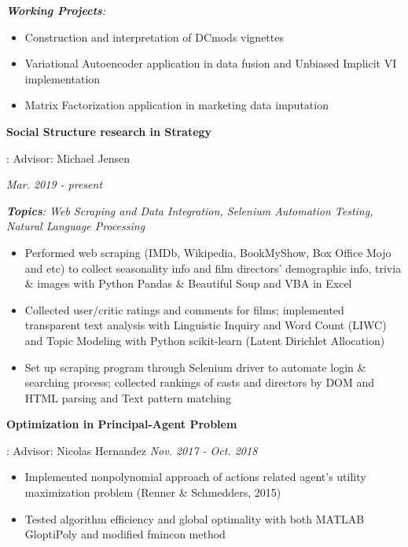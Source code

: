 \documentclass[letterpaper,10pt]{article}
\newcommand{\resumeItem}[2]{
  \item\small{
    \textbf{#1}{: #2 \vspace{-2pt}}
  }
}
\newcommand{\resumeSubItem}[2]{\resumeItem{#1}{#2}\vspace{-4pt}}
\begin{document}
{    {\sl \textbf{Working Projects}:}
    \begin{itemize}
        \item  Construction and interpretation of DCmods vignettes
        \item  Variational Autoencoder application in data fusion and Unbiased Implicit VI implementation
        \item  Matrix Factorization application in marketing data imputation
    \end{itemize}
  }


      \resumeSubItem{Social Structure research in Strategy}{Advisor: Michael Jensen
                   \hspace{210pt}
	  {\textit{Mar. 2019 - present} \par}
      {\sl \textbf{Topics}: Web Scraping and Data Integration, Selenium Automation Testing, Natural Language Processing}
        \begin{itemize}
            \item Performed web scraping (IMDb, Wikipedia, BookMyShow, Box Office Mojo and etc) to collect seasonality info and film directors' demographic info, trivia \& images with Python Pandas \& Beautiful Soup and VBA in Excel
            \item Collected user/critic ratings and comments for films; implemented transparent text analysis with Linguistic Inquiry and Word Count (LIWC) and Topic Modeling with Python scikit-learn (Latent Dirichlet Allocation)
            \item Set up scraping program through Selenium driver to automate login \& searching process; collected rankings of casts and directors by DOM and HTML parsing and Text pattern matching
        \end{itemize}
     }

    \resumeSubItem{Optimization in Principal-Agent Problem}{Advisor: Nicolas Hernandez
                    \hspace{169pt}
	  {\textit{Nov. 2017 - Oct. 2018}}
	  \vspace{-5pt}
        \begin{itemize}
      \item Implemented nonpolynomial approach of actions related agent's utility maximization problem (Renner \& Schmedders, 2015)
	\item Tested algorithm efficiency and global optimality with both MATLAB GloptiPoly and modified fmincon method
	\end{itemize}
	}
	
\end{document}
